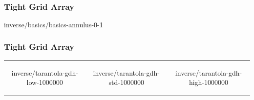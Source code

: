 % 

\begin{frame}\frametitle{Tight Grid Array}
\center
	\begin{overpic}[ scale = 0.55 ]
		{\pLocalGraphics inverse/basics/basics-annulus-0-1}
	\end{overpic}
\end{frame}
%

\begin{frame}\frametitle{Tight Grid Array}
\begin{table}[htp]
\begin{center}
	\begin{tabular}{ccc}
		\begin{overpic}[ scale = 0.325 ] {\pLocalGraphics inverse/tarantola-gdh-low-1000000} \end{overpic} &
		\begin{overpic}[ scale = 0.325 ] {\pLocalGraphics inverse/tarantola-gdh-std-1000000} \end{overpic} &
		\begin{overpic}[ scale = 0.325 ] {\pLocalGraphics inverse/tarantola-gdh-high-1000000} \end{overpic} 
	\end{tabular}
\end{center}
\end{table}%
\end{frame}

\endinput  %

